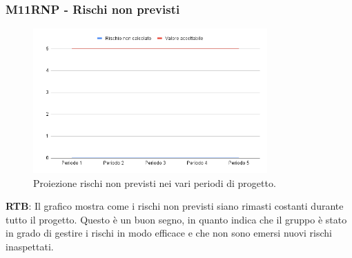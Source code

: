 \subsubsection{M11RNP - Rischi non previsti}
\begin{figure}[H]
    \centering
    \includegraphics[width=0.8\textwidth]{../Images/PianoDiQualifica/M11RNP.png}
    \caption{Proiezione rischi non previsti nei vari periodi di progetto.}
    \label{fig:7}
\end{figure}

\textbf{RTB}: Il grafico mostra come i rischi non previsti siano rimasti costanti durante tutto il progetto. Questo è un buon segno, in quanto indica che il gruppo è stato in grado di gestire i rischi in modo efficace e che non sono emersi nuovi rischi inaspettati.